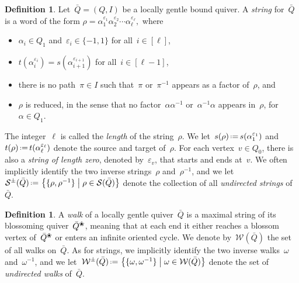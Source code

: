\documentclass{amsart}
\theoremstyle{definition}
\newtheorem{definition}[theorem]{Definition}
\newcommand{\set}[2]{\left\{ #1 \;\middle|\; #2 \right\}} %
\newcommand{\eqdef}{\mbox{\,\raisebox{0.2ex}{\scriptsize\ensuremath{\mathrm:}}\ensuremath{=}\,}} %
\newcommand{\darkblue}{\color{darkblue}} %
\newcommand{\defn}[1]{\textsl{\darkblue #1}} %
\newcommand{\blossom}{^\text{\ding{96}}} %
\newcommand{\strings}{\mathcal{S}} %
\newcommand{\walks}{\mathcal{W}} %
\begin{document}
\begin{definition}
\label{def:string}
Let~$\bar Q = (Q,I)$ be a locally gentle bound quiver.
A \defn{string} for~$\bar Q$ is a word of the form
\(
\rho = \alpha_1^{\varepsilon_1}\alpha_2^{\varepsilon_2}\cdots \alpha_\ell^{\varepsilon_\ell},
\)
where
	\begin{itemize}
	\item $\alpha_i \in Q_1$ and~$\varepsilon_i \in \{-1,1\}$ for all~$i \in [\ell]$,
	\item $t(\alpha_i^{\varepsilon_i}) = s(\alpha_{i+1}^{\varepsilon_{i+1}})$ for all~$i \in [\ell-1]$,
	\item there is no path~$\pi \in I$ such that~$\pi$ or~$\pi^{-1}$ appears as a factor of~$\rho$, and
	\item $\rho$ is reduced, in the sense that no factor~$\alpha\alpha^{-1}$ or~$\alpha^{-1}\alpha$ appears in~$\rho$, for~$\alpha \in Q_1$.
	\end{itemize}
The integer~$\ell$ is called the \defn{length} of the string~$\rho$.
We let~$s(\rho) \eqdef s(\alpha_1^{\varepsilon_1})$ and~$t(\rho) \eqdef t(\alpha_\ell^{\varepsilon_\ell})$ denote the source and target of~$\rho$.
For each vertex~$v \in Q_0$, there is also a \defn{string of length zero}, denoted by~$\varepsilon_v$, that starts and ends at~$v$.
We often implicitly identify the two inverse strings~$\rho$ and~$\rho^{-1}$, and we let~$\strings^\pm(\bar Q) \eqdef \set{\{\rho, \rho^{-1}\}}{\rho \in \strings(\bar Q)}$ denote the collection of all \defn{undirected strings} of~$\bar Q$.

\end{definition}

\begin{definition}
\label{def:walk}
A \defn{walk} of a locally gentle quiver~$\bar Q$ is a maximal string of its blossoming quiver~$\bar Q \blossom$, meaning that at each end it either reaches a blossom vertex of~$\bar Q \blossom$ or enters an infinite oriented cycle.
We denote by~$\walks(\bar Q)$ the set of all walks on~$\bar Q$.
As for strings, we implicitly identify the two inverse walks~$\omega$ and~$\omega^{-1}$, and we let~$\walks^\pm(\bar Q) \eqdef \set{\{\omega, \omega^{-1}\}}{\omega \in \walks(\bar Q)}$ denote the set of \defn{undirected walks} of~$\bar Q$.
\end{definition}
\end{document}
